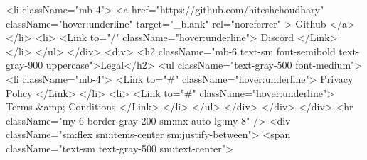 {                                                    <li className="mb-4">
                                                        <a
                                                            href="https://github.com/hiteshchoudhary"
                                                            className="hover:underline"
                                                            target="_blank"
                                                            rel="noreferrer"
                                                        >
                                                            Github
                                                        </a>
                                                    </li>
                                                    <li>
                                                        <Link to="/" className="hover:underline">
                                                            Discord
                                                        </Link>
                                                    </li>
                                                </ul>
                                            </div>
                                            <div>
                                                <h2 className="mb-6 text-sm font-semibold text-gray-900 uppercase">Legal</h2>
                                                <ul className="text-gray-500 font-medium">
                                                    <li className="mb-4">
                                                        <Link to="#" className="hover:underline">
                                                            Privacy Policy
                                                        </Link>
                                                    </li>
                                                    <li>
                                                        <Link to="#" className="hover:underline">
                                                            Terms &amp; Conditions
                                                        </Link>
                                                    </li>
                                                </ul>
                                            </div>
                                        </div>
                                    </div>
                                    <hr className="my-6 border-gray-200 sm:mx-auto lg:my-8" />
                                    <div className="sm:flex sm:items-center sm:justify-between">
                                        <span className="text-sm text-gray-500 sm:text-center">
}
